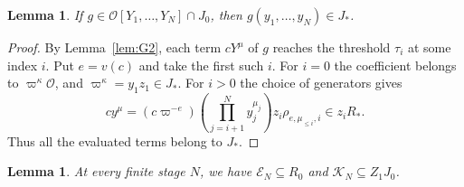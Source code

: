 \documentclass[11pt, letterpaper]{article}
\newtheorem{lemma}[theorem]{Lemma}
\theoremstyle{definition}
\theoremstyle{remark}
\begin{document}
\begin{lemma}
    \label{lem:N}
    If $g \in \mathcal{O}[Y_{1}, \dots, Y_{N}] \cap J_{0}$, then $g(y_{1}, \dots, y_{N}) \in J_{*}$.
\end{lemma}

\begin{proof}
    By Lemma~\ref{lem:G2}, each term $cY^{\mu}$ of $g$ reaches the threshold $\tau_{i}$ at some index $i$.
    Put $e = v(c)$ and take the first such $i$.
    For $i = 0$ the coefficient belongs to $\varpi^{\kappa}\mathcal{O}$, and $\varpi^{\kappa} = y_{1}z_{1} \in J_{*}$.
    For $i > 0$ the choice of generators gives
    \[
        cy^{\mu}
        = (c\varpi^{-e})\left(\prod_{j = i + 1}^{N} y_{j}^{\mu_{j}}\right)
          z_{i}\rho_{e, \mu_{\le i}, i} \in z_{i}R_{*}.
    \]
    Thus all the evaluated terms belong to $J_{*}$.
\end{proof}

\begin{lemma}
    \label{lem:X}
    At every finite stage $N$, we have $\mathcal{E}_{N} \subseteq R_{0}$ and $\mathcal{K}_{N} \subseteq Z_{1}J_{0}$.
\end{lemma}
\end{document}
